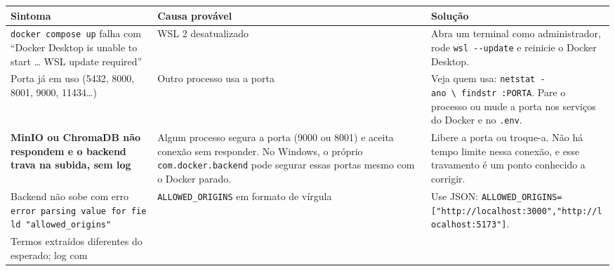 \documentclass[
  brazilian,
  a4paper,12pt,oneside]{report}
\newcounter{none} %
\begin{document}
{\def\LTcaptype{none} %
\begin{longtable}[]{@{}
  >{\raggedright\arraybackslash}p{}
  >{\raggedright\arraybackslash}p{}
  >{\raggedright\arraybackslash}p{}@{}}
\toprule\noalign{}
\begin{minipage}[b]{\linewidth}\raggedright
Sintoma
\end{minipage} & \begin{minipage}[b]{\linewidth}\raggedright
Causa provável
\end{minipage} & \begin{minipage}[b]{\linewidth}\raggedright
Solução
\end{minipage} \\
\midrule\noalign{}
\endhead
\bottomrule\noalign{}
\endlastfoot
\texttt{docker\ compose\ up} falha com ``Docker Desktop is unable to
start \ldots{} WSL update required'' & WSL 2 desatualizado & Abra um
terminal como administrador, rode
\texttt{wsl\ -}\allowbreak{}\texttt{-}\allowbreak{}\texttt{update} e
reinicie o Docker Desktop. \\
Porta já em uso (5432, 8000, 8001, 9000, 11434\ldots) & Outro processo
usa a porta & Veja quem usa:
\texttt{netstat\ -}\allowbreak{}\texttt{ano\ \textbackslash{}\textbar{}\ findstr\ :}\allowbreak{}\texttt{PORTA}.
Pare o processo ou mude a porta nos serviços do Docker e no
\texttt{.}\allowbreak{}\texttt{env}. \\
\textbf{MinIO ou ChromaDB não respondem e o backend trava na subida, sem
log} & Algum processo segura a porta (9000 ou 8001) e aceita conexão sem
responder. No Windows, o próprio
\texttt{com.}\allowbreak{}\texttt{docker.}\allowbreak{}\texttt{backend}
pode segurar essas portas mesmo com o Docker parado. & Libere a porta ou
troque-a. Não há tempo limite nessa conexão, e esse travamento é um
ponto conhecido a corrigir. \\
Backend não sobe com erro
\texttt{error\ parsing\ value\ for\ field\ "allowed\_}\allowbreak{}\texttt{origins"}
& \texttt{ALLOWED\_}\allowbreak{}\texttt{ORIGINS} em formato de vírgula
& Use JSON:
\texttt{ALLOWED\_}\allowbreak{}\texttt{ORIGINS=}\allowbreak{}\texttt{{[}"http:}\allowbreak{}\texttt{/}\allowbreak{}\texttt{/}\allowbreak{}\texttt{localhost:}\allowbreak{}\texttt{3000","http:}\allowbreak{}\texttt{/}\allowbreak{}\texttt{/}\allowbreak{}\texttt{localhost:}\allowbreak{}\texttt{5173"{]}}. \\
Termos extraídos diferentes do esperado; log com

\end{longtable}}
\end{document}
